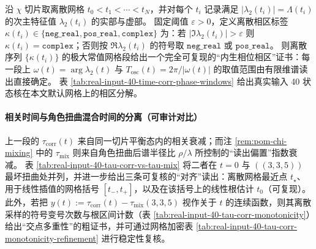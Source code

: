 


\begin{remark}
\label{prop:chi-slice-phase-windows-certificate}
沿 $\chi$ 切片取离散网格 $t_0<t_1<\cdots<t_N$，并对每个 $t_i$ 记录满足 $|\lambda_2(t_i)|=\Lambda(t_i)$ 的次主特征值 $\lambda_2(t_i)$ 的实部与虚部。
固定阈值 $\varepsilon>0$，定义离散相区标签
\(
\kappa(t_i)\in\{\texttt{neg\_real},\texttt{pos\_real},\texttt{complex}\}
\)
为：若 $|\Im\lambda_2(t_i)|>\varepsilon$ 则 $\kappa(t_i)=\texttt{complex}$；否则按 $\Re\lambda_2(t_i)$ 的符号取 $\texttt{neg\_real}$ 或 $\texttt{pos\_real}$。
则离散序列 $\{\kappa(t_i)\}$ 的极大常值网格段给出一个完全可复现的“内生相位相区”证书：每一段上 $\omega(t)=\arg\lambda_2(t)$ 与 $T_{\mathrm{osc}}(t)=2\pi/|\omega(t)|$ 的取值范围由有限维谱读出直接确定。
表 \ref{tab:real-input-40-time-corr-phase-windows} 给出真实输入 40 状态核在本文默认网格上的相区分解。
\end{remark}



\paragraph{相关时间与角色扭曲混合时间的分离（可审计对比）}
上一段的 $\tau_{\mathrm{corr}}(t)$ 来自同一切片平衡态内的相关衰减；而注 \ref{rem:pom-chi-mixing} 中的 $\tau_{\mathrm{mix}}$ 则来自角色扭曲后谱半径比 $\rho/\lambda$ 所控制的“读出偏置”指数衰减。
表 \ref{tab:real-input-40-tau-corr-vs-tau-mix} 将二者在 $t=0$ 与 $((3,3,5))$ 最坏扭曲处并列，并进一步给出三条可复核的“对齐”读出：离散网格最近点 $t_\star$、用于线性插值的网格括号 $[t_-,t_+]$，以及在该括号上的线性根估计 $t_0$（可复现）。
此外，若把 $y(t):=\tau_{\mathrm{corr}}(t)-\tau_{\mathrm{mix}}(3,3,5)$ 视作关于 $t$ 的连续函数，则其离散采样的符号变号次数与根区间计数（表 \ref{tab:real-input-40-tau-corr-monotonicity}）给出“交点多重性”的粗证书，并可通过网格加密表 \ref{tab:real-input-40-tau-corr-monotonicity-refinement} 进行稳定性复核。

